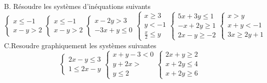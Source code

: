 \documentclass[12pt]{article}
\begin{document}
B. Résoudre les systèmes d’inéquations suivants\\
\begin{equation*}
\begin{cases}
x\leq-1\\
x-y>2
\end{cases}
\begin{cases}
x\leq-1\\
x-y>2
\end{cases}
\begin{cases}
x-2y>3\\
-3x+y\leq 0
\end{cases}
\begin{cases}
x \geq 3\\
	y<-1\\
\frac{x}{2} \leq y
\end{cases}
\begin{cases}
5x + 3y \leq 1\\
-x+2y\geq 1 \\
2x-y\geq -2
\end{cases}
\begin{cases}
x>y\\
x+y < -1\\
3x \geq 2y +1
\end{cases}
\end{equation*}
C.Resoudre graphiquement les systèmes suivantes
\begin{equation*}
\begin{cases}
2x-y\leq 3\\
1 \leq 2x-y
\end{cases}
\begin{cases}
x+y-3<0\\
y+2x>\\
y\leq 2
\end{cases}
\begin{cases}
2x+y\geq 2\\
x+2y\leq 4\\
x+2y\geq 6
\end{cases}
\end{equation*}
\end{document}
